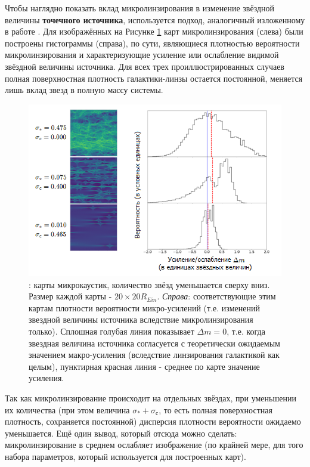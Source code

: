 Чтобы наглядно показать вклад микролинзирования в изменение звёздной величины \textbf{точечного источника}, используется подход, аналогичный изложенному в работе \cite{shwamb2002}. Для изображённых на Рисунке \ref{fig:histograms} карт микролинзирования (слева) были построены гистограммы (справа), по сути, являющиеся плотностью вероятности микролинзирования и характеризующие усиление или ослабление видимой звёздной величины источника. Для всех трех проиллюстрированных случаев полная поверхностная плотность галактики-линзы остается постоянной, меняется лишь вклад звезд в полную массу системы.

\begin{figure}[H]
    \centering
	\includegraphics[scale=0.75]{pics/histograms.png}
	\caption{: карты микрокаустик, количество звёзд уменьшается сверху вниз. Размер каждой карты - $20 \times 20 R_{Ein}$. \textit{Справа}: соответствующие этим картам плотности вероятности микро-усилений (т.е. изменений звездной величины источника вследствие микролинзирования только). Сплошная голубая линия показывает $\Delta m=0$, т.е. когда звездная величина источника согласуется с теоретически ожидаемым значением макро-усиления (вследствие линзирования галактикой как целым), пунктирная красная линия - среднее по карте значение усиления. \label{fig:histograms}} 
\end{figure}

Так как микролинзирование происходит на отдельных звёздах, при уменьшении их количества (при этом величина $\sigma_*+\sigma_с$, то есть полная поверхностная плотность, сохраняется постоянной) дисперсия плотности вероятности ожидаемо уменьшается. Ещё один вывод, который отсюда можно сделать: микролинзирование в среднем ослабляет изображение (по крайней мере, для того набора параметров, который используется для построенных карт). 
